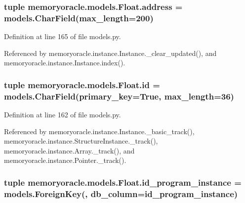 \subsubsection[{address}]{\setlength{\rightskip}{0pt plus 5cm}tuple memoryoracle.\+models.\+Float.\+address = models.\+Char\+Field(max\+\_\+length=200)\hspace{0.3cm}{\ttfamily [static]}}\label{classmemoryoracle_1_1models_1_1Float_ad95190c8fdf7df2c0086ee24be73799c}


Definition at line 165 of file models.\+py.



Referenced by memoryoracle.\+instance.\+Instance.\+\_\+clear\+\_\+updated(), and memoryoracle.\+instance.\+Instance.\+index().

\hypertarget{classmemoryoracle_1_1models_1_1Float_aded74b5ac3f60ce974c7ab2ba1894bb8}{}
\subsubsection[{id}]{\setlength{\rightskip}{0pt plus 5cm}tuple memoryoracle.\+models.\+Float.\+id = models.\+Char\+Field(primary\+\_\+key=True, max\+\_\+length=36)\hspace{0.3cm}{\ttfamily [static]}}\label{classmemoryoracle_1_1models_1_1Float_aded74b5ac3f60ce974c7ab2ba1894bb8}


Definition at line 162 of file models.\+py.



Referenced by memoryoracle.\+instance.\+Instance.\+\_\+basic\+\_\+track(), memoryoracle.\+instance.\+Structure\+Instance.\+\_\+track(), memoryoracle.\+instance.\+Array.\+\_\+track(), and memoryoracle.\+instance.\+Pointer.\+\_\+track().

\hypertarget{classmemoryoracle_1_1models_1_1Float_a4ac54166d455e2f4339ddd2393ef7dec}{}
\subsubsection[{id\+\_\+program\+\_\+instance}]{\setlength{\rightskip}{0pt plus 5cm}tuple memoryoracle.\+models.\+Float.\+id\+\_\+program\+\_\+instance = models.\+Foreign\+Key(\textquotesingle{}, db\+\_\+column=\textquotesingle{}id\+\_\+program\+\_\+instance\textquotesingle{})\hspace{0.3cm}{\ttfamily [static]}}\label{classmemoryoracle_1_1models_1_1Float_a4ac54166d455e2f4339ddd2393ef7dec}


